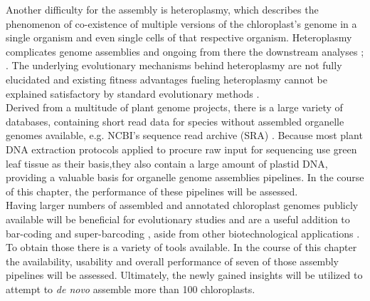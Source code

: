 Another difficulty for the assembly is heteroplasmy, which describes the phenomenon of
co-existence of multiple versions of the chloroplast's genome in a single organism and
even single cells of that respective organism. Heteroplasmy complicates genome assemblies
and ongoing from there the downstream analyses \cite{corriveau_1988}; \cite{Chat2002}. The
underlying evolutionary mechanisms behind heteroplasmy are not fully elucidated and
existing fitness advantages fueling heteroplasmy cannot be explained satisfactory by
standard evolutionary methods
\cite{Scar2016}. \\

Derived from a multitude of plant genome projects, there is a large variety of databases,
containing short read data for species without assembled organelle genomes available,
e.g. NCBI's sequence read archive (SRA) \cite{SRA2010}. Because most plant DNA extraction
protocols applied to procure raw input for sequencing use green leaf tissue as their
basis,they also contain a large amount of plastid DNA, providing a valuable basis for
organelle genome assemblies pipelines. In the course of this chapter, the performance of
these pipelines will be assessed.\\
Having larger numbers of assembled and annotated chloroplast genomes publicly available
will be beneficial for evolutionary studies and are a useful addition to bar-coding and
super-barcoding \cite{coissac_barcodes_2016}, aside from other biotechnological
applications \cite{daniell_chloroplast_2016}. To obtain those there is a variety of tools
available. In the course of this chapter the availability, usability and overall
performance of seven of those assembly pipelines will be assessed. Ultimately, the newly
gained insights will be utilized to attempt to \textit{de novo} assemble more than 100
chloroplasts.

